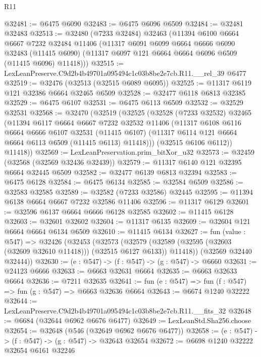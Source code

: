 \begin{lexlean}{R11}
\begin{coremodule}
@32481 := @6475 @6090
@32483 := @6475 @6096 @6509
@32484 := @32481 @32483
@32513 := @32480
    (@7233 @32484)
    @32463
    (@11394
      @6100
      @6664
      @6667
      @7232
      @32484
      @11406
      (@11317
        @6091
        @6099
        @6664
        @6666
        @6090
        @32483
        (@11415 @6090)
        (@11317 @6097 @121 @6664 @6664 @6096 @6509 (@11415 @6096) @11418)))
@32515 := LexLeanPreserve.C9d2b4b49701a095494c1c03b8be2e7cb.R11.__rel_39 @6477
@32519 := @32476 (@32513 (@32515 @6089 @6095))
@32525 := @11317 @6119 @121 @32386 @6664 @32465 @6509
@32528 := @32477 @6118 @6813 @32385
@32529 := @6475 @6107
@32531 := @6475 @6113 @6509
@32532 := @32529 @32531
@32568 := @32470
    (@32519
      (@32525
        (@32528
          (@7233 @32532)
          @32465
          (@11394
            @6117
            @6664
            @6667
            @7232
            @32532
            @11406
            (@11317
              @6108
              @6116
              @6664
              @6666
              @6107
              @32531
              (@11415 @6107)
              (@11317 @6114 @121 @6664 @6664 @6113 @6509 (@11415 @6113) @11418)))
          (@32515 @6106 @6112))
        @11418))
@32569 := LexLeanPreservation.prim_bitXor_u32
@32573 := @32459 (@32568 (@32569 @32436 @32439))
@32579 := @11317 @6140 @121 @32395 @6664 @32445 @6509
@32582 := @32477 @6139 @6813 @32394
@32583 := @6475 @6128
@32584 := @6475 @6134
@32585 := @32584 @6509
@32586 := @32583 @32585
@32589 := @32582 (@7233 @32586) @32445
@32595 := @11394 @6138 @6664 @6667 @7232 @32586 @11406
@32596 := @11317 @6129
@32601 := @32596 @6137 @6664 @6666 @6128 @32585
@32602 := @11415 @6128
@32603 := @32601 @32602
@32604 := @11317 @6135
@32609 := @32604 @121 @6664 @6664 @6134 @6509
@32610 := @11415 @6134
@32627 := fun (value : @547) =>
  @32426
    (@32453
      (@32573
        (@32579 (@32589 (@32595 (@32603 (@32609 @32610 @11418))) (@32515 @6127 @6133)) @11418))
      (@32569 @32440 @32444))
@32630 := (e : @547) -> (f : @547) -> (g : @547) -> @6660
@32631 := @24123 @6666
@32633 := @6663 @32631 @6664
@32635 := @6663 @32633 @6664
@32636 := @7211 @32635
@32641 := fun (e : @547) => fun (f : @547) => fun (g : @547) => @6663 @32636 @6664
@32643 := @6674 @1240 @32222
@32644 := LexLeanPreserve.C9d2b4b49701a095494c1c03b8be2e7cb.R11.__fits_32
@32648 := @6684 (@32644 @6962 @6676 @6477)
@32649 := LexLeanStd.Sha256.choose
@32654 := @32648 (@546 (@32649 @6962 @6676 @6477))
@32658 := (e : @547) -> (f : @547) -> (g : @547) -> @32643 @32654
@32672 := @6698
    @1240
    @32222
    @32654
    @6161
    @32246

\end{coremodule}
\end{lexlean}
